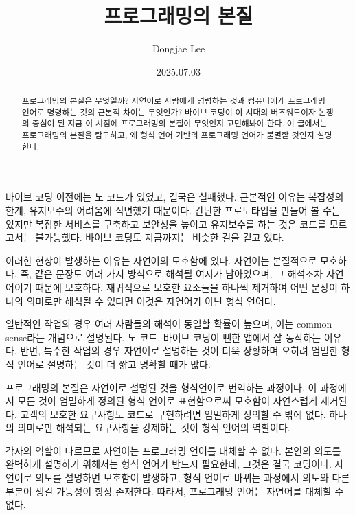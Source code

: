 \documentclass[11pt, oneside]{article}
\title{프로그래밍의 본질}
\author{Dongjae Lee}
\date{2025.07.03}
\begin{document}
\maketitle

\begin{abstract}
	프로그래밍의 본질은 무엇일까? 자연어로 사람에게 명령하는 것과 컴퓨터에게 프로그래밍 언어로 명령하는 것의 근본적 차이는 무엇인가?
	바이브 코딩이 이 시대의 버즈워드이자 논쟁의 중심이 된 지금 이 시점에 프로그래밍의 본질이 무엇인지 고민해봐야 한다.
	이 글에서는 프로그래밍의 본질을 탐구하고, 왜 형식 언어 기반의 프로그래밍 언어가 불멸할 것인지 설명한다.
\end{abstract}

바이브 코딩 이전에는 노 코드가 있었고, 결국은 실패했다. 근본적인 이유는 복잡성의 한계, 유지보수의 어려움에 직면했기 때문이다.
간단한 프로토타입을 만들어 볼 수는 있지만 복잡한 서비스를 구축하고 보안성을 높이고 유지보수를 하는 것은 코드를 모르고서는 불가능했다.
바이브 코딩도 지금까지는 비슷한 길을 걷고 있다.

이러한 현상이 발생하는 이유는 자연어의 모호함에 있다. 자연어는 본질적으로 모호하다.
즉, 같은 문장도 여러 가지 방식으로 해석될 여지가 남아있으며, 그 해석조차 자연어이기 때문에 모호하다.
재귀적으로 모호한 요소들을 하나씩 제거하여 어떤 문장이 하나의 의미로만 해석될 수 있다면 이것은 자연어가 아닌 형식 언어다.

일반적인 작업의 경우 여러 사람들의 해석이 동일할 확률이 높으며, 이는 common-sense라는 개념으로 설명된다. 노 코드, 바이브 코딩이 뻔한 앱에서 잘 동작하는 이유다.
반면, 특수한 작업의 경우 자연어로 설명하는 것이 더욱 장황하며 오히려 엄밀한 형식 언어로 설명하는 것이 더 짧고 명확할 때가 많다.

프로그래밍의 본질은 자연어로 설명된 것을 형식언어로 번역하는 과정이다. 이 과정에서 모든 것이 엄밀하게 정의된 형식 언어로 표현함으로써 모호함이 자연스럽게 제거된다.
고객의 모호한 요구사항도 코드로 구현하려면 엄밀하게 정의할 수 밖에 없다. 하나의 의미로만 해석되는 요구사항을 강제하는 것이 형식 언어의 역할이다.

각자의 역할이 다르므로 자연어는 프로그래밍 언어를 대체할 수 없다.
본인의 의도를 완벽하게 설명하기 위해서는 형식 언어가 반드시 필요한데, 그것은 결국 코딩이다.
자연어로 의도를 설명하면 모호함이 발생하고, 형식 언어로 바뀌는 과정에서 의도와 다른 부분이 생길 가능성이 항상 존재한다.
따라서, 프로그래밍 언어는 자연어를 대체할 수 없다.
\end{document}
